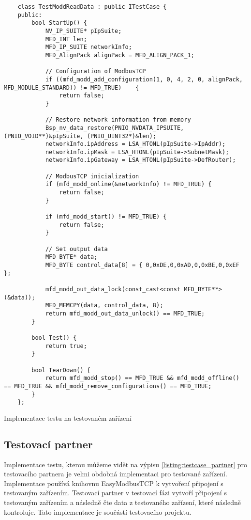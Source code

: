 \begin{listing}[htbp]
    \centering
    \begin{verbatim}
    class TestModdReadData : public ITestCase {
    public:
        bool StartUp() {
            NV_IP_SUITE* pIpSuite;
            MFD_INT len;
            MFD_IP_SUITE networkInfo;
            MFD_AlignPack alignPack = MFD_ALIGN_PACK_1;

            // Configuration of ModbusTCP
            if ((mfd_modd_add_configuration(1, 0, 4, 2, 0, alignPack, MFD_MODULE_STANDARD)) != MFD_TRUE)    { 
                return false; 
            }

            // Restore network information from memory
            Bsp_nv_data_restore(PNIO_NVDATA_IPSUITE, (PNIO_VOID**)&pIpSuite, (PNIO_UINT32*)&len);
            networkInfo.ipAddress = LSA_HTONL(pIpSuite->IpAddr);
            networkInfo.ipMask = LSA_HTONL(pIpSuite->SubnetMask);
            networkInfo.ipGateway = LSA_HTONL(pIpSuite->DefRouter);

            // ModbusTCP inicialization
            if (mfd_modd_online(&networkInfo) != MFD_TRUE) {
                return false;
            }

            if (mfd_modd_start() != MFD_TRUE) {
                return false;
            }
            
            // Set output data
            MFD_BYTE* data;
            MFD_BYTE control_data[8] = { 0,0xDE,0,0xAD,0,0xBE,0,0xEF };
            
            mfd_modd_out_data_lock(const_cast<const MFD_BYTE**>(&data));
            MFD_MEMCPY(data, control_data, 8);
            return mfd_modd_out_data_unlock() == MFD_TRUE;
        }

        bool Test() {
            return true;
        }

        bool TearDown() {
            return mfd_modd_stop() == MFD_TRUE && mfd_modd_offline() == MFD_TRUE && mfd_modd_remove_configurations() == MFD_TRUE;
        }
    };
    \end{verbatim}
\caption{Implementace testu na testovaném zařízení}
\label{listing:testcase_device}
\end{listing}


\subsection{Testovací partner}
Implementace testu, kterou můžeme vidět na výpisu \ref{listing:testcase_partner} pro testovacího partnera je velmi obdobná implementaci pro testované zařízení. Implementace používá knihovnu EasyModbusTCP k vytvoření připojení s testovaným zařízením. 
Testovací partner v testovací fázi vytvoří připojení s testovaným zařízením a následně čte data z testovaného zařízení, které následně kontroluje. Tato implementace je součástí testovacího projektu.


